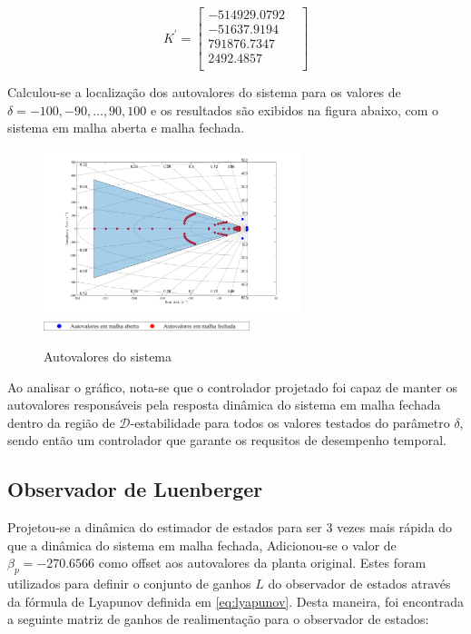 \begin{equation*} \label{eq:ganhoscontrolador}
    K^'=
    \begin{bmatrix}
        -514929.0792&\\	
        -51637.9194&\\	
        791876.7347&\\
        2492.4857&\\
    \end{bmatrix}
\end{equation*}

Calculou-se a localização dos autovalores do sistema para os valores de $\delta = -100, -90, \dots, 90, 100$ e os resultados são exibidos na figura abaixo, com o sistema em malha aberta e malha fechada.
\FloatBarrier
\begin{figure}[htbp]
    \begin{centering}
    \includegraphics[width=7.5cm]{img/regiao_d_estabilidade_autoval.png}
    \includegraphics[width=6cm]{img/regiao_d_estabilidade_autoval_leg.png}
    \caption{Autovalores do sistema}
    \label{fig:regiao_d_estabilidade_autoval_leg}
    \end{centering}
\end{figure}
\FloatBarrier

Ao analisar o gráfico, nota-se que o controlador projetado foi capaz de manter os autovalores responsáveis pela resposta dinâmica do sistema em malha fechada dentro da região de \( \mathcal{D}\)-estabilidade para todos os valores testados do parâmetro $\delta$, sendo então um controlador que garante os requsitos de desempenho temporal.
\subsection{Observador de Luenberger}
Projetou-se a dinâmica do estimador de estados para ser 3 vezes  mais rápida do que a dinâmica do sistema em malha fechada, Adicionou-se o valor de $\beta_p=-270.6566$ como offset aos autovalores da planta original.
Estes foram utilizados para definir o conjunto de ganhos $L$ do observador de estados através da fórmula de Lyapunov definida em \eqref{eq:lyapunov}. 
Desta maneira, foi encontrada a seguinte matriz de ganhos de realimentação para o observador de estados:

